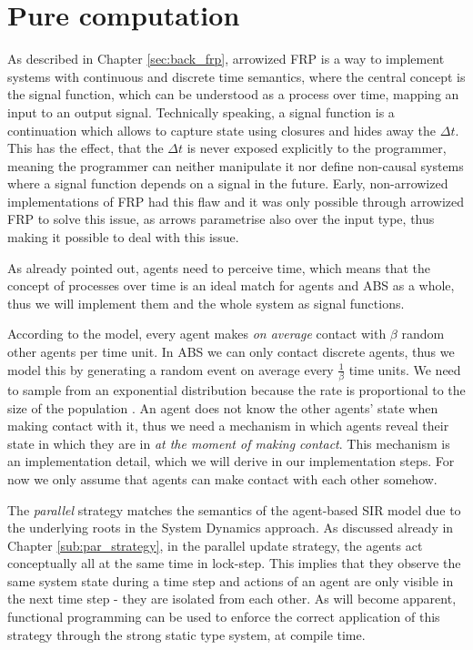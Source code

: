 \section{Pure computation}
\label{sec:timedriven_firststep}
As described in Chapter \ref{sec:back_frp}, arrowized FRP \cite{hughes_generalising_2000} is a way to implement systems with continuous and discrete time semantics, where the central concept is the signal function, which can be understood as a process over time, mapping an input to an output signal. Technically speaking, a signal function is a continuation which allows to capture state using closures and hides away the $\Delta t$. This has the effect, that the $\Delta t$ is never exposed explicitly to the programmer, meaning the programmer can neither manipulate it nor define non-causal systems where a signal function depends on a signal in the future. Early, non-arrowized implementations of FRP had this flaw and it was only possible through arrowized FRP to solve this issue, as arrows parametrise also over the input type, thus making it possible to deal with this issue.

As already pointed out, agents need to perceive time, which means that the concept of processes over time is an ideal match for agents and ABS as a whole, thus we will implement them and the whole system as signal functions.

According to the model, every agent makes \textit{on average} contact with $\beta$ random other agents per time unit. In ABS we can only contact discrete agents, thus we model this by generating a random event on average every $\frac{1}{\beta}$ time units. We need to sample from an exponential distribution because the rate is proportional to the size of the population \cite{borshchev_system_2004}. An agent does not know the other agents' state when making contact with it, thus we need a mechanism in which agents reveal their state in which they are in \textit{at the moment of making contact}. This mechanism is an implementation detail, which we will derive in our implementation steps. For now we only assume that agents can make contact with each other somehow.

The \textit{parallel} strategy matches the semantics of the agent-based SIR model due to the underlying roots in the System Dynamics approach. As discussed already in Chapter \ref{sub:par_strategy}, in the parallel update strategy, the agents act conceptually all at the same time in lock-step. This implies that they observe the same system state during a time step and actions of an agent are only visible in the next time step - they are isolated from each other. As will become apparent, functional programming can be used to enforce the correct application of this strategy through the strong static type system, at compile time.

